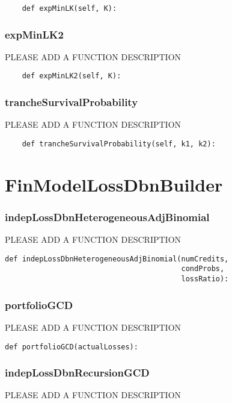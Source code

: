 \documentclass[twoside,11pt]{book}
\begin{document}
\begin{lstlisting}
    def expMinLK(self, K):
\end{lstlisting}

\subsubsection*{{\bf expMinLK2}}
PLEASE ADD A FUNCTION DESCRIPTION

\begin{lstlisting}
    def expMinLK2(self, K):
\end{lstlisting}

\subsubsection*{{\bf trancheSurvivalProbability}}
PLEASE ADD A FUNCTION DESCRIPTION

\begin{lstlisting}
    def trancheSurvivalProbability(self, k1, k2):
\end{lstlisting}

\newpage
\section{FinModelLossDbnBuilder}

\subsubsection*{{\bf indepLossDbnHeterogeneousAdjBinomial}}
PLEASE ADD A FUNCTION DESCRIPTION

\begin{lstlisting}
def indepLossDbnHeterogeneousAdjBinomial(numCredits,
                                         condProbs,
                                         lossRatio):
\end{lstlisting}

\subsubsection*{{\bf portfolioGCD}}
PLEASE ADD A FUNCTION DESCRIPTION

\begin{lstlisting}
def portfolioGCD(actualLosses):
\end{lstlisting}

\subsubsection*{{\bf indepLossDbnRecursionGCD}}
PLEASE ADD A FUNCTION DESCRIPTION
\end{document}
